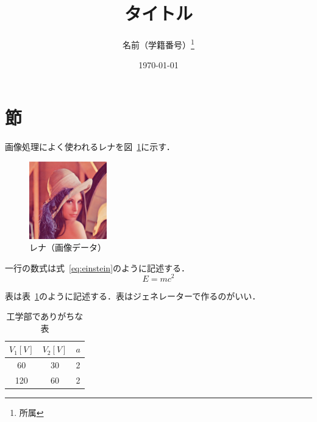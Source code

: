\documentclass[uplatex,dvipdfmx,a4paper]{jsarticle}
\title{タイトル}
\author{名前（学籍番号）\thanks{所属}}
\date{\today}
\begin{document}
    \maketitle
    \section{節}
    画像処理によく使われるレナを図~\ref{fig:lena}に示す．
    \begin{figure}[htbp]
        \centering
        \includegraphics[width=0.3\textwidth]{fig/lena_std}
        \caption{レナ（画像データ）}
        \label{fig:lena}
    \end{figure}
    
    一行の数式は式~\ref{eq:einstein}のように記述する．
    \begin{equation}
        E = mc^2\label{eq:einstein}
    \end{equation}

    表は表~\ref{tab:table}のように記述する．表はジェネレーターで作るのがいい\cite{CreateLa7:online}．
    \begin{table}[htbp]
        \centering
        \caption{工学部でありがちな表}
        \label{tab:table}
        \begin{tabular}{ccc}
        \toprule
        $V_1\si{[V]}$ & $V_2\si{[V]}$ & $a$\\ \midrule
        60 & 30 & 2 \\ 
        120 & 60 & 2 \\ \bottomrule
        \end{tabular}
    \end{table}


    
    
\end{document}
